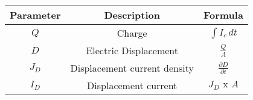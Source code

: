 \setlength{\arrayrulewidth}{0.3mm}
\setlength{\tabcolsep}{20pt}
\renewcommand{\arraystretch}{1.5}

\begin{tabular}{|c|c|c|}
\hline
Parameter & Description & Formula\\
\hline
$Q$ & Charge & $\int I_c\, dt$\\
\hline
$D$ & Electric Displacement & $\frac{Q}{A}$\\ 
\hline
$J_D$ & Displacement current density & $\frac{\partial D}{\partial t}$\\
\hline
$I_D$ & Displacement current & $J_D\text{ x }A$\\
\hline




\end{tabular}

